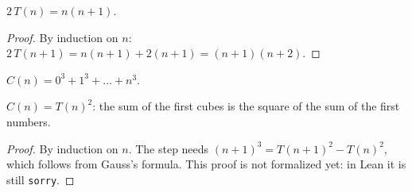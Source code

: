 \begin{theorem}[Gauss]\label{thm:two_mul_sumTo}
  \leanok
  $2\,T(n) = n(n + 1)$.
\end{theorem}
\begin{proof}\leanok
  By induction on $n$: $2\,T(n + 1) = n(n + 1) + 2(n + 1) = (n + 1)(n + 2)$.
\end{proof}

\begin{definition}\label{def:cubeSum}
  \leanok
  $C(n) = 0^3 + 1^3 + \dots + n^3$.
\end{definition}

\begin{theorem}[Nicomachus]\label{thm:nicomachus}
  \leanok
  $C(n) = T(n)^2$: the sum of the first cubes is the square of the sum of the first numbers.
\end{theorem}
\begin{proof}
  By induction on $n$. The step needs $(n + 1)^3 = T(n + 1)^2 - T(n)^2$, which follows from
  Gauss's formula. This proof is not formalized yet: in Lean it is still \texttt{sorry}.
\end{proof}
